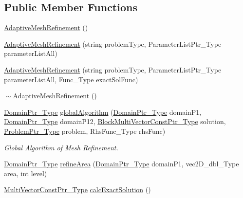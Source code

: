 \subsection*{Public Member Functions}
\begin{DoxyCompactItemize}
\item 
\hyperlink{classFEDD_1_1AdaptiveMeshRefinement_a259e41c282b1db70f233ac94854ba8bd}{Adaptive\+Mesh\+Refinement} ()
\item 
\hyperlink{classFEDD_1_1AdaptiveMeshRefinement_a6331efe29307723fb532acea922d8489}{Adaptive\+Mesh\+Refinement} (string problem\+Type, Parameter\+List\+Ptr\+\_\+\+Type parameter\+List\+All)
\item 
\hyperlink{classFEDD_1_1AdaptiveMeshRefinement_acf48e548d006ada2f7bec61fb2bc1d36}{Adaptive\+Mesh\+Refinement} (string problem\+Type, Parameter\+List\+Ptr\+\_\+\+Type parameter\+List\+All, Func\+\_\+\+Type exact\+Sol\+Func)
\item 
\hyperlink{classFEDD_1_1AdaptiveMeshRefinement_ae9fa1b37f179d6d82c6e0b2bd8e898ec}{$\sim$\+Adaptive\+Mesh\+Refinement} ()
\item 
\hyperlink{classFEDD_1_1AdaptiveMeshRefinement_a98b097661d0e4c38e4182582078e2cd6}{Domain\+Ptr\+\_\+\+Type} \hyperlink{classFEDD_1_1AdaptiveMeshRefinement_a10f773edf498ea2bcc21c5b1dc36a32e}{global\+Algorithm} (\hyperlink{classFEDD_1_1AdaptiveMeshRefinement_a98b097661d0e4c38e4182582078e2cd6}{Domain\+Ptr\+\_\+\+Type} domain\+P1, \hyperlink{classFEDD_1_1AdaptiveMeshRefinement_a98b097661d0e4c38e4182582078e2cd6}{Domain\+Ptr\+\_\+\+Type} domain\+P12, \hyperlink{classFEDD_1_1AdaptiveMeshRefinement_a62f59092ab4dee90885c4d38b123ca9c}{Block\+Multi\+Vector\+Const\+Ptr\+\_\+\+Type} solution, \hyperlink{classFEDD_1_1AdaptiveMeshRefinement_a442c6ca5dc4d866e3b1c6cdb613e2281}{Problem\+Ptr\+\_\+\+Type} problem, Rhs\+Func\+\_\+\+Type rhs\+Func)
\begin{DoxyCompactList}\small\item\em Global Algorithm of Mesh Refinement. \end{DoxyCompactList}\item 
\hyperlink{classFEDD_1_1AdaptiveMeshRefinement_a98b097661d0e4c38e4182582078e2cd6}{Domain\+Ptr\+\_\+\+Type} \hyperlink{classFEDD_1_1AdaptiveMeshRefinement_abbff0752b1d6febdb36194e379e8b876}{refine\+Area} (\hyperlink{classFEDD_1_1AdaptiveMeshRefinement_a98b097661d0e4c38e4182582078e2cd6}{Domain\+Ptr\+\_\+\+Type} domain\+P1, vec2\+D\+\_\+dbl\+\_\+\+Type area, int level)
\item 
\hyperlink{classFEDD_1_1AdaptiveMeshRefinement_ad8871639b0a35039184611ce286a446c}{Multi\+Vector\+Const\+Ptr\+\_\+\+Type} \hyperlink{classFEDD_1_1AdaptiveMeshRefinement_a006a35028c7c627a1dd885df67204084}{calc\+Exact\+Solution} ()

\end{DoxyCompactItemize}
